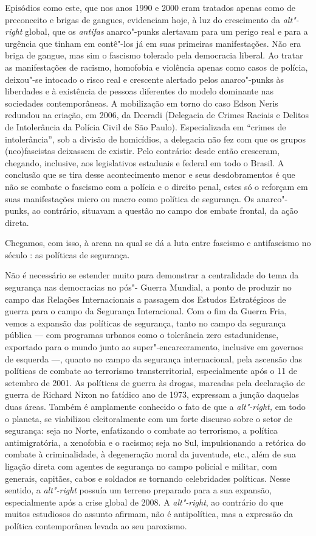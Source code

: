 Episódios como este, que nos anos 1990 e 2000 eram tratados apenas como
de preconceito e brigas de gangues, evidenciam hoje, à luz do
crescimento da \emph{alt"-right} global, que os \emph{antifas}
anarco"-punks alertavam para um perigo real e para a urgência que tinham
em contê"-los já em suas primeiras manifestações. Não era briga de
gangue, mas sim o fascismo tolerado pela democracia liberal. Ao tratar
as manifestações de racismo, homofobia e violência apenas como casos de
polícia, deixou"-se intocado o risco real e crescente alertado pelos
anarco"-punks às liberdades e à existência de pessoas diferentes do
modelo dominante nas sociedades contemporâneas. A mobilização em torno
do caso Edson Neris redundou na criação, em 2006, da Decradi (Delegacia
de Crimes Raciais e Delitos de Intolerância da Polícia Civil de São
Paulo). Especializada em ``crimes de intolerância'', sob a divisão de
homicídios, a delegacia não fez com que os grupos (neo)fascistas
deixassem de existir. Pelo contrário: desde então cresceram, chegando,
inclusive, aos legislativos estaduais e federal em todo o Brasil. A
conclusão que se tira desse acontecimento menor e seus desdobramentos é
que não se combate o fascismo com a polícia e o direito penal, estes só
o reforçam em suas manifestações micro ou macro como política de
segurança. Os anarco"-punks, ao contrário, situavam a questão no campo
dos embate frontal, da ação direta.

Chegamos, com isso, à arena na qual se dá a luta entre fascismo e
antifascismo no século : as políticas de segurança.

Não é necessário se estender muito para demonstrar a centralidade do
tema da segurança nas democracias no pós"- Guerra Mundial, a ponto de
produzir no campo das Relações Internacionais a passagem dos Estudos
Estratégicos de guerra para o campo da Segurança Interacional. Com o fim
da Guerra Fria, vemos a expansão das políticas de segurança, tanto no
campo da segurança pública --- com programas urbanos como o tolerância
zero estadunidense, exportado para o mundo junto ao
super"-encarceramento, inclusive em governos de esquerda ---, quanto no
campo da segurança internacional, pela ascensão das políticas de combate
ao terrorismo transterritorial, especialmente após o 11 de setembro de
2001. As políticas de guerra às drogas, marcadas pela declaração de
guerra de Richard Nixon no fatídico ano de 1973, expressam a junção
daquelas duas áreas. Também é amplamente conhecido o fato de que a
\emph{alt"-right,} em todo o planeta, se viabilizou eleitoralmente com um
forte discurso sobre o setor de segurança: seja no Norte, enfatizando o
combate ao terrorismo, a política antimigratória, a xenofobia e o
racismo; seja no Sul, impulsionando a retórica do combate à
criminalidade, à degeneração moral da juventude, etc., além de sua
ligação direta com agentes de segurança no campo policial e militar, com
generais, capitães, cabos e soldados se tornando celebridades políticas.
Nesse sentido, a \emph{alt"-right} possuía um terreno preparado para a
sua expansão, especialmente após a crise global de 2008. A
\emph{alt"-right}, ao contrário do que muitos estudiosos do assunto
afirmam, não é antipolítica, mas a expressão da política contemporânea
levada ao seu paroxismo.

